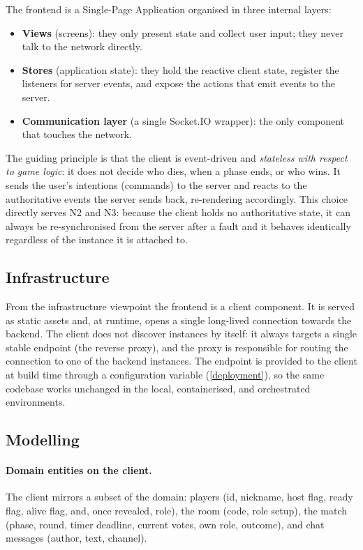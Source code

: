 \documentclass{scrartcl}
\begin{document}
The frontend is a Single-Page Application organised in three internal
layers:
\begin{itemize}
  \item \textbf{Views} (screens): they only present state and collect
  user input; they never talk to the network directly.
  \item \textbf{Stores} (application state): they hold the reactive
  client state, register the listeners for server events, and expose
  the actions that emit events to the server.
  \item \textbf{Communication layer} (a single Socket.IO wrapper): the
  only component that touches the network.
\end{itemize}

The guiding principle is that the client is event-driven and
\emph{stateless with respect to game logic}: it does not decide who
dies, when a phase ends, or who wins. It sends the user's intentions
(commands) to the server and reacts to the authoritative events the
server sends back, re-rendering accordingly. This choice directly serves
N2 and N3: because the client holds no authoritative state, it can
always be re-synchronised from the server after a fault and it behaves
identically regardless of the instance it is attached to.

\subsection{Infrastructure}\label{infrastructure}

From the infrastructure viewpoint the frontend is a client component. It
is served as static assets and, at runtime, opens a single long-lived
connection towards the backend. The client does not discover instances
by itself: it always targets a single stable endpoint (the reverse
proxy), and the proxy is responsible for routing the connection to one
of the backend instances. The endpoint is provided to the client at
build time through a configuration variable (\cref{deployment}), so the
same codebase works unchanged in the local, containerised, and
orchestrated environments.

\subsection{Modelling}\label{modelling}

\paragraph{Domain entities on the client.} The client mirrors a subset of
the domain: players (id, nickname, host flag, ready flag, alive flag,
and, once revealed, role), the room (code, role setup), the match
(phase, round, timer deadline, current votes, own role, outcome), and
chat messages (author, text, channel).
\end{document}
